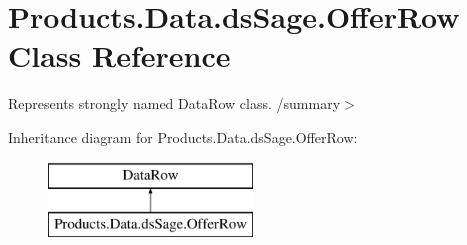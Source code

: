 \hypertarget{class_products_1_1_data_1_1ds_sage_1_1_offer_row}{}\section{Products.\+Data.\+ds\+Sage.\+Offer\+Row Class Reference}
\label{class_products_1_1_data_1_1ds_sage_1_1_offer_row}


Represents strongly named Data\+Row class. /summary$>$  


Inheritance diagram for Products.\+Data.\+ds\+Sage.\+Offer\+Row\+:\begin{figure}[H]
\begin{center}
\leavevmode
\includegraphics[height=2.000000cm]{class_products_1_1_data_1_1ds_sage_1_1_offer_row}
\end{center}
\end{figure}
